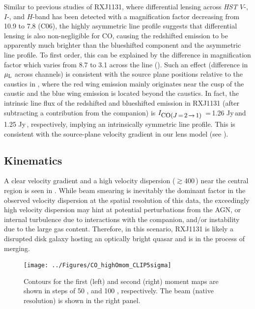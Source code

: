 \documentclass[]{emulateapj}
\begin{document}

Similar to previous studies of RXJ1131, where
differential lensing across {\it HST}
$V$-, $I$-, and $H$-band has been detected with a
magnification factor decreasing from 10.9 to 7.8 (C06),
the highly asymmetric \bco line profile suggests that
differential lensing is also non-negligible for CO,
causing the redshifted emission to be apparently much brighter than the
blueshifted component and the asymmetric line profile.   
To first order, this can be explained by the difference in magnification factor which
varies from 8.7 to 3.1 across the \bco line ().  %
Such an effect (difference in $\mu_{\rm L}$ across channels) is consistent with the source plane
positions relative to the caustics in , where the red wing 
emission mainly originates near the cusp 
of the caustic and the blue wing emission is located beyond the caustics.
In fact, the intrinsic line flux of the redshifted and 
blueshifted emission in RXJ1131 (after subtracting a contribution from the companion)
is $I_{\small \mbox{CO($J$\,=\,2\,$\rightarrow$\,1) }}$\,=\,1.26 Jy\,\kms and 1.25 Jy\,\kms, respectively, 
implying an intrinsically symmetric line profile. This is consistent with the source-plane
velocity gradient in our lens model (see ). 

\subsection{\bco Kinematics}
A clear velocity gradient and a high
velocity dispersion ($\gtrsim$400\,\kms) near the central region
is seen in . While beam smearing is inevitably the
dominant factor in the observed velocity dispersion
at the spatial resolution of this data, the exceedingly
high velocity dispersion may hint
at potential perturbations from the AGN, or internal turbulence due to
interactions with the companion, and/or instability due to the large gas
content. 
Therefore, in this scenario, RXJ1131 is 
likely a disrupted disk galaxy hosting an optically
bright quasar and is in the process of merging.

\begin{figure}[!htbp]
\centering
\texttt{[image: ../Figures/CO\_highOmom\_CLIP5sigma]}
\caption{
Contours for the first (left) and second (right) moment maps are shown in steps of
50 \kms, and 100 \kms, respectively. The beam (native resolution) is shown in the right panel.
\label{fig:CO21highO}}
\end{figure}
\end{document}
